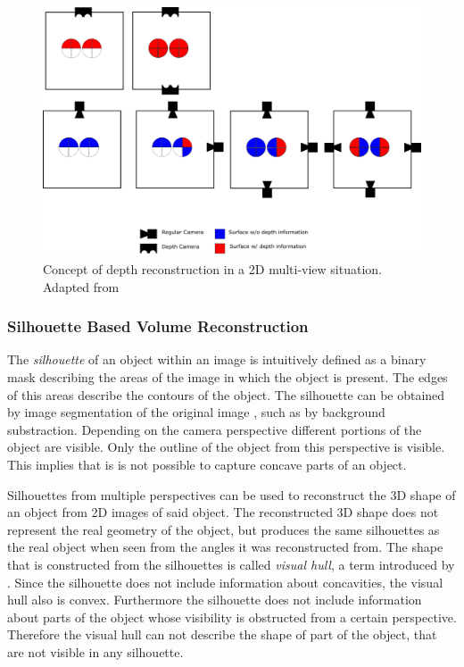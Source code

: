 \begin{figure}[hbt]
	\centering
	\includegraphics[width=1.0\textwidth, keepaspectratio]{resources/multiview}
	\caption[Concept of depth reconstruction in a 2D multi-view situation]{\label{fig:sota:mulitviewtop}Concept of depth reconstruction in a 2D multi-view situation.
	Adapted from \textcite[][]{sonaten2011volume}}
\end{figure}

\subsubsection{Silhouette Based Volume Reconstruction}

The \emph{silhouette} of an object within an image is intuitively defined 
as a binary mask describing the areas of the image in which the object is present. 
The edges of this areas describe the contours of the object.
The silhouette can be obtained by image segmentation of the original image \autocite[][Chap.~2]{zhang2017imageanalysis}, such as by background substraction.
Depending on the camera perspective different portions of the object are visible.
Only the outline of the object from this perspective is visible.
This implies that is is not possible to capture concave parts of an object.

Silhouettes from multiple perspectives can be used to reconstruct the \ac{3D} shape of an object from \ac{2D} images of said object.
The reconstructed \ac{3D} shape does not represent the real geometry of the object, but produces the same silhouettes as the real object when seen from the angles it was reconstructed from.
The shape that is constructed from the silhouettes is called \emph{visual hull}, a term introduced by \textcite[][]{laurentini1994hull}.
Since the silhouette does not include information about concavities,
the visual hull also is convex. 
Furthermore the silhouette does not include information about parts of the object whose visibility is obstructed from a certain perspective.
Therefore the visual hull can not describe the shape of  part of the object, that are not visible in any silhouette.

